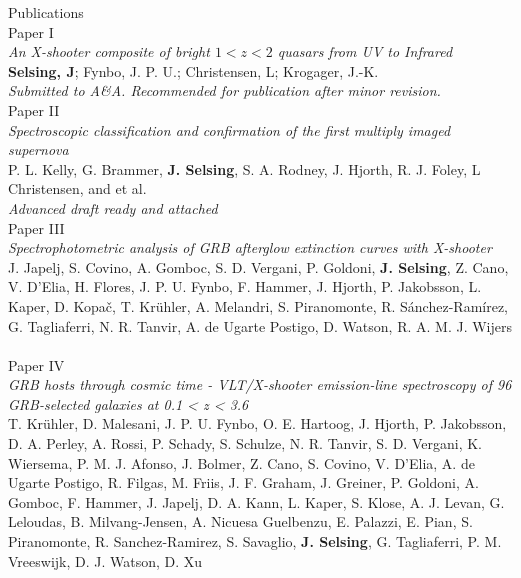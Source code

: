 \clearpage

{\Large Publications} \\
{\large Paper I} \\
\textit{An X-shooter composite of bright $1<z<2$ quasars from UV to Infrared} \\
\textbf{Selsing, J}; Fynbo, J. P. U.; Christensen, L;  Krogager, J.-K. \\
\textit{Submitted to A\&A. Recommended for publication after minor revision.} \\

{\large Paper II} \\
\textit{Spectroscopic classification and confirmation of the first multiply imaged supernova}\\
P. L. Kelly, G. Brammer, \textbf{J. Selsing}, S. A. Rodney, J. Hjorth, R. J. Foley, L Christensen, and et al. \\
\textit{Advanced draft ready and attached} \\


{\large Paper III} \\
\textit{Spectrophotometric analysis of GRB afterglow extinction curves with X-shooter} \\
J. Japelj, S. Covino, A. Gomboc, S. D. Vergani, P. Goldoni,\textbf{ J. Selsing}, Z. Cano, V. D'Elia, H. Flores, J. P. U. Fynbo, F. Hammer, J. Hjorth, P. Jakobsson, L. Kaper, D. Kopač, T. Krühler, A. Melandri, S. Piranomonte, R. Sánchez-Ramírez, G. Tagliaferri, N. R. Tanvir, A. de Ugarte Postigo, D. Watson, R. A. M. J. Wijers \\
\citet{Japelj2015} \\


{\large Paper IV} \\
\textit{GRB hosts through cosmic time - VLT/X-shooter emission-line spectroscopy of 96 GRB-selected galaxies at 0.1 < z < 3.6} \\
T. Krühler, D. Malesani, J. P. U. Fynbo, O. E. Hartoog, J. Hjorth, P. Jakobsson, D. A. Perley, A. Rossi, P. Schady, S. Schulze, N. R. Tanvir, S. D. Vergani, K. Wiersema, P. M. J. Afonso, J. Bolmer, Z. Cano, S. Covino, V. D'Elia, A. de Ugarte Postigo, R. Filgas, M. Friis, J. F. Graham, J. Greiner, P. Goldoni, A. Gomboc, F. Hammer, J. Japelj, D. A. Kann, L. Kaper, S. Klose, A. J. Levan, G. Leloudas, B. Milvang-Jensen, A. Nicuesa Guelbenzu, E. Palazzi, E. Pian, S. Piranomonte, R. Sanchez-Ramirez, S. Savaglio, \textbf{J. Selsing}, G. Tagliaferri, P. M. Vreeswijk, D. J. Watson, D. Xu \\
\citet{Kruhler2015} \\

